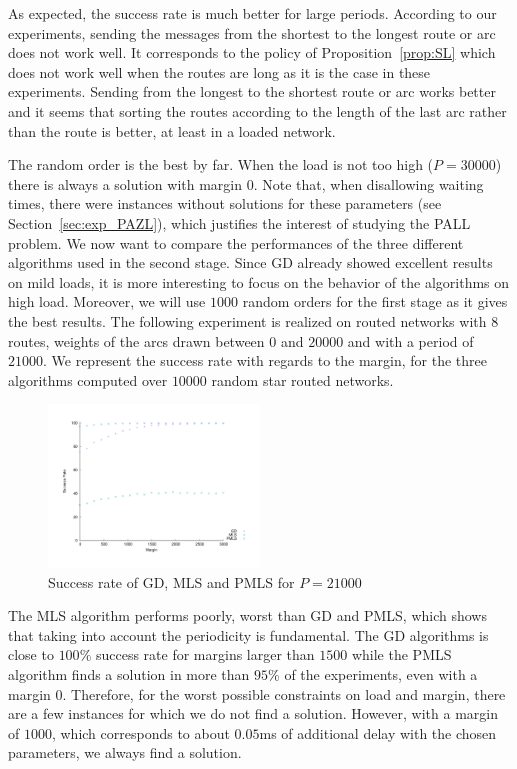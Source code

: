 \documentclass[10pt, conference, letterpaper]{IEEEtran}
\begin{document}
     As expected, the  success rate is much better for large periods. According to our experiments, sending the messages from the shortest to the longest route or arc does not work well. It corresponds to the policy of Proposition~\ref{prop:SL} which does not work well when the routes are long as it is the case in these experiments. Sending from the longest to the shortest route or arc works better and it seems that sorting the routes according to the length of the last arc rather than the route is better, at least in a loaded network. 
     
     The random order is the best by far. When the load is not too high ($P = 30000$) there is always a solution with margin $0$.
     Note that, when disallowing waiting times, there were instances without solutions for these parameters (see Section~\ref{sec:exp_PAZL}), which justifies the interest of studying the PALL problem. We now want to compare the performances of the three different algorithms used in the second stage. Since GD already showed excellent results on mild loads, it is more interesting to focus on the behavior of the algorithms on high load. Moreover, we will use $1000$ random orders for the first stage as it gives the best results. The following experiment is realized on routed networks with $8$ routes, weights of the arcs drawn between $0$ and $20000$ and with a period of $21000$.  We represent the success rate with regards to the margin, for the three algorithms computed over $10000$ random star routed networks. 
   

 
    \begin{figure} [H] 
       \begin{center}
      \includegraphics[width=0.5\textwidth]{retour_21000.pdf}
      \end{center}
      \caption{Success rate of GD, MLS and PMLS for $P = 21000$}
     \label{fig:success21000}
     \end{figure}
     
     The MLS algorithm performs poorly, worst than GD and PMLS, which shows that taking into account the periodicity is fundamental.
     The GD algorithms is close to $100\%$ success rate for margins larger than $1500$ while the PMLS algorithm finds a solution in more than $95\%$ of the experiments, even with a margin $0$. Therefore, for the worst possible constraints on load and margin, there are a few instances for which we do not find a solution. However, with a margin of $1000$, which corresponds to about $0.05$ms of additional delay with the chosen parameters, we always find a solution. 
     
\end{document}
